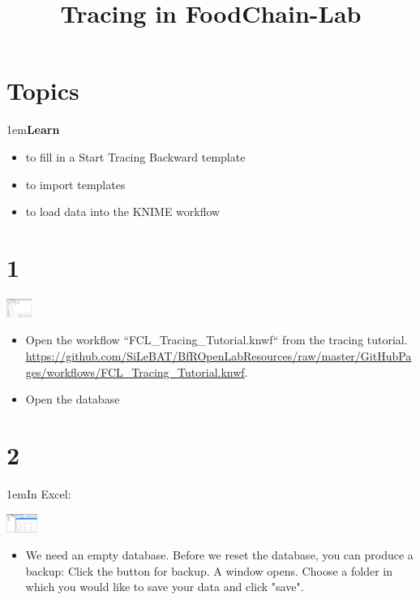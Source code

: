 \documentclass[10pt]{beamer}
\title{Tracing in FoodChain-Lab}
\date{}
\begin{document}
\maketitle

\section{Topics}
\begin{frame}
\leftskip1em\textbf{Learn}
	\begin{itemize}
		\item to fill in a Start Tracing Backward template
    \item to import templates
    \item to load data into the KNIME workflow
	\end{itemize}
\end{frame}

\section{1}
\begin{frame}
	\begin{center}
			\includegraphics[height=0.609cm]{1.png}
	\end{center}
	\begin{itemize}
		\item Open the workflow “FCL_Tracing_Tutorial.knwf“ from the tracing tutorial. \url{https://github.com/SiLeBAT/BfROpenLabResources/raw/master/GitHubPages/workflows/FCL_Tracing_Tutorial.knwf}.
    \item Open the database
	\end{itemize}
\end{frame}

\section{2}
\begin{frame}
\leftskip1em{In Excel:}
	\begin{center}
			\includegraphics[height=0.609cm]{2.png}
	\end{center}
	\begin{itemize}
		\item We need an empty database. Before we reset the database, you can produce a backup: Click the button for backup. A window opens. Choose a folder in which you would like to save your data and click "save".
	\end{itemize}
\end{frame}
\end{document}
